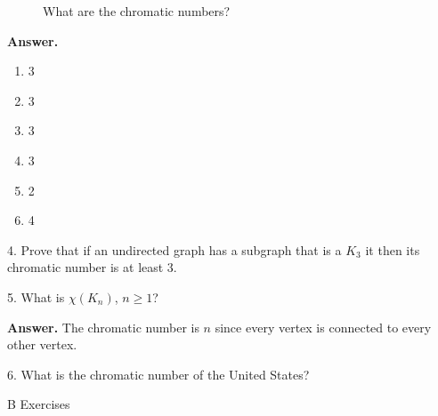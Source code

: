 \documentclass[10pt,]{book}
\theoremstyle{plain}
\theoremstyle{definition}
\theoremstyle{definition}
\theoremstyle{definition}
\theoremstyle{definition}
\theoremstyle{definition}
\numberwithin{equation}{section}
\begin{document}
\begin{exercisegroup}
\begin{figure}
\caption{What are the chromatic numbers?
                \label{fig-exercise-9-6-3}}
\end{figure}
\par\smallskip
\par\smallskip
\noindent\textbf{Answer.}\hypertarget{answer-17}{}\quad
\leavevmode%
\begin{multicols}{3}
\begin{enumerate}[label=\alph*]
\item\hypertarget{li-134}{} 3%
\item\hypertarget{li-135}{}  3%
\item\hypertarget{li-136}{}  3%
\item\hypertarget{li-137}{}  3%
\item\hypertarget{li-138}{}  2%
\item\hypertarget{li-139}{}  4%
\end{enumerate}
\end{multicols}
%
\item[4.]\hypertarget{exercise-45}{} Prove that if an undirected graph has a subgraph that is a \(K_3\) it then its chromatic number is at least 3.%
\par\smallskip
\item[5.]\hypertarget{exercise-46}{} What is \(\chi \left(K_n\right)\), \(n\geq 1\)?%
\par\smallskip
\par\smallskip
\noindent\textbf{Answer.}\hypertarget{answer-18}{}\quad
 The chromatic number is \(n\) since every vertex is connected to every other vertex.
%
\item[6.]\hypertarget{exercise-47}{} What is the chromatic number of the United States? %
\par\smallskip
\end{exercisegroup}
\par\smallskip\noindent
\hypertarget{exercisegroup-11}{}\typeout{************************************************}
\typeout{************************************************}
B Exercises%
\end{document}
